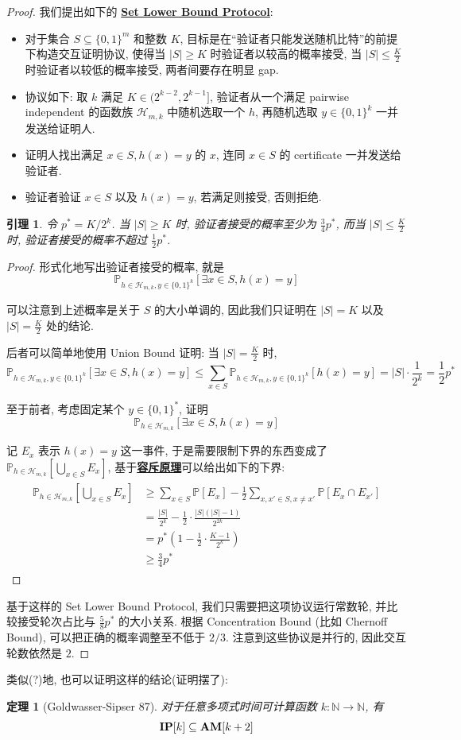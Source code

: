 \documentclass[8pt]{article}
\theoremstyle{compact}
\newtheorem{theorem}{定理}[section]
\newtheorem{lemma}{引理}[section]
\def\obj#1{\textbf{\uline{#1}}}
\def\le{\leqslant}
\def\ge{\geqslant}
\begin{document}
\begin{proof}
	我们提出如下的 \obj{Set Lower Bound Protocol}:
	\begin{itemize}
		\item 对于集合 $S \subseteq \{0, 1\}^m$ 和整数 $K$, 目标是在“验证者只能发送随机比特”的前提下构造交互证明协议, 使得当 $|S| \ge K$ 时验证者以较高的概率接受, 当 $|S| \le \frac{K}{2}$ 时验证者以较低的概率接受, 两者间要存在明显 gap.
	    \item 协议如下: 取 $k$ 满足 $K \in (2^{k-2}, 2^{k-1}]$, 验证者从一个满足 pairwise independent 的函数族 $\mathcal H_{m, k}$ 中随机选取一个 $h$, 再随机选取 $y \in \{0, 1\}^k$ 一并发送给证明人.
        \item 证明人找出满足 $x \in S, h(x) = y$ 的 $x$, 连同 $x \in S$ 的 certificate 一并发送给验证者.
        \item 验证者验证 $x \in S$ 以及 $h(x) = y$, 若满足则接受, 否则拒绝.
	\end{itemize}
	\begin{lemma}
		令 $p^* = K / 2^k$. 当 $|S| \ge K$ 时, 验证者接受的概率至少为 $\frac34 p^*$, 而当 $|S| \le \frac{K}{2}$ 时, 验证者接受的概率不超过 $\frac12 p^*$.
	\end{lemma}
	\begin{proof}
		形式化地写出验证者接受的概率, 就是 $$\mathbb P_{h \in \mathcal H_{m, k}, y \in \{0, 1\}^k} [\exists x \in S, h(x) = y]$$

		可以注意到上述概率是关于 $S$ 的大小单调的, 因此我们只证明在 $|S| = K$ 以及 $|S| = \frac K2$ 处的结论.
		
		后者可以简单地使用 Union Bound 证明: 当 $|S| = \frac{K}{2}$ 时,  $$\mathbb P_{h \in \mathcal H_{m, k}, y \in \{0, 1\}^k} [\exists x \in S, h(x) = y] \le \sum_{x \in S} \mathbb P_{h \in \mathcal H_{m, k}, y \in \{0, 1\}^k} [h(x) = y] = |S| \cdot \frac{1}{2^k} = \frac12 p^*$$

		至于前者, 考虑固定某个 $y \in \{0, 1\}^*$, 证明 $$\mathbb P_{h \in \mathcal H_{m, k}} [\exists x \in S, h(x) = y]$$

		记 $E_x$ 表示 $h(x) = y$ 这一事件, 于是需要限制下界的东西变成了 $\mathbb P_{h \in \mathcal H_{m, k}} \left[\bigcup_{x \in S} E_x\right]$, 基于\obj{容斥原理}可以给出如下的下界: 
		\begin{align*}
			\begin{split}
				\mathbb P_{h \in \mathcal H_{m, k}} \left[\bigcup_{x \in S} E_x\right] &\ge \sum_{x \in S}\mathbb P[E_x] - \frac12\sum_{x, x' \in S, x \neq x'}\mathbb P[E_x \cap E_{x'}] \\&= \frac{|S|}{2^k} - \frac12 \cdot \frac{|S|(|S| - 1)}{2^{2k}} \\&= p^*\left(1 - \frac12 \cdot \frac{K-1}{2^k}\right) \\&\ge \frac34 p^*
			\end{split}
		\end{align*}
	\end{proof}

	基于这样的 Set Lower Bound Protocol, 我们只需要把这项协议运行常数轮, 并比较接受轮次占比与 $\frac58 p^*$ 的大小关系. 根据 Concentration Bound (比如 Chernoff Bound), 可以把正确的概率调整至不低于 $2/3$. 注意到这些协议是并行的, 因此交互轮数依然是 $2$.
\end{proof}

类似(?)地, 也可以证明这样的结论(证明摆了): \begin{theorem}[Goldwasser-Sipser 87]
	对于任意多项式时间可计算函数 $k: \mathbb N \to \mathbb N$, 有 $$\textbf{IP}[k] \subseteq \textbf{AM}[k+2]$$
\end{theorem}
\end{document}
